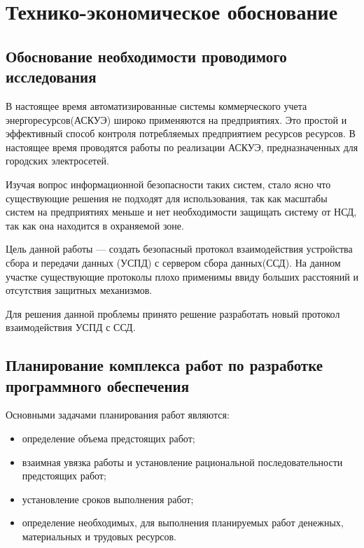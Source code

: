 \newpage
\section{Технико-экономическое обоснование}
\setcounter{figure}{0}

\subsection{Обоснование необходимости проводимого исследования}

В настоящее время автоматизированные системы коммерческого учета энергоресурсов(АСКУЭ) широко применяются на предприятиях. Это простой и эффективный способ контроля потребляемых предприятием ресурсов ресурсов. В настоящее время проводятся работы по реализации АСКУЭ, предназначенных для городских электросетей.

Изучая вопрос информационной безопасности таких систем, стало ясно
что существующие решения не подходят для использования, так как масштабы систем на предприятиях меньше и нет необходимости защищать систему от НСД, так как она находится в охраняемой зоне.

Цель данной работы — создать безопасный протокол взаимодействия устройства сбора и передачи данных (УСПД) с сервером сбора данных(ССД). На данном участке существующие протоколы плохо применимы ввиду больших расстояний и отсутствия защитных механизмов.

Для решения данной проблемы принято решение разработать новый протокол взаимодействия УСПД с ССД.

\subsection{Планирование комплекса работ по разработке программного обеспечения}

Основными задачами планирования работ являются:

\begin{itemize}
 \item определение объема предстоящих работ;
 \item взаимная увязка работы и установление рациональной последовательности предстоящих работ;
 \item установление сроков выполнения работ;
 \item определение необходимых, для выполнения планируемых работ денежных, материальных и трудовых ресурсов.
\end{itemize}

